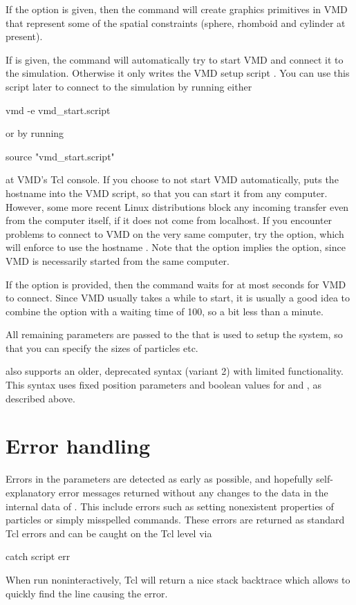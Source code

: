 If the option  is given, then the command will create
graphics primitives in VMD that represent some of the spatial
constraints (sphere, rhomboid and cylinder at present).

If  is given, the command will automatically try to start VMD and connect it to the \es{} simulation.  Otherwise it only writes the VMD
setup script . You can use this script later to connect to the \es{} simulation by running either
\begin{code}
  vmd -e vmd_start.script
\end{code}
or by running
\begin{code}
  source "vmd\_start.script"
\end{code}
at VMD's Tcl console. If you choose to not start VMD automatically,
 puts the hostname into the VMD script, so
that you can start it from any computer. However, some more recent Linux
distributions block any incoming transfer even from the computer itself,
if it does not come from localhost. If you encounter problems to connect
to VMD on the very same computer, try the  option, which
will enforce to use the hostname . Note that the  option implies the  option, since VMD is
necessarily started from the same computer.

If the option  is provided, then the command waits for at most
 seconds for VMD to connect. Since VMD usually takes a while
to start, it is usually a good idea to combine the  option with a waiting time of 100, so a bit less than a minute.

All remaining parameters are passed to the  that is used
to setup the system, so that you can specify the sizes of particles etc.

 also supports an older, deprecated syntax (variant 2) with limited functionality. This syntax uses fixed position
parameters and boolean values for  and , as
described above.




\section{Error handling}
Errors in the parameters are detected as early as possible, and
hopefully self-explanatory error messages returned without any changes
to the data in the internal data of \es. This include errors such as
setting nonexistent properties of particles or simply misspelled
commands. These errors are returned as standard Tcl errors and can be
caught on the Tcl level via
\begin{tclcode}
catch {script} err 
\end{tclcode}
When run noninteractively, Tcl will return a nice stack backtrace
which allows to quickly find the line causing the error.

